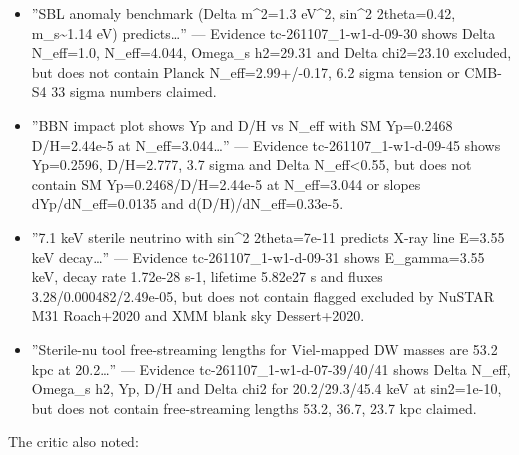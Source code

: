 \documentclass[11pt,a4paper]{article}
\begin{document}
\begin{itemize}
  \item ''SBL anomaly benchmark (Delta m\textasciicircum{}2=1.3 eV\textasciicircum{}2, sin\textasciicircum{}2 2theta=0.42, m\_s\textasciitilde{}1.14 eV) predicts\ldots{}'' --- Evidence tc-261107\_1-w1-d-09-30 shows Delta N\_eff=1.0, N\_eff=4.044, Omega\_s h2=29.31 and Delta chi2=23.10 excluded, but does not contain Planck N\_eff=2.99+/-0.17, 6.2 sigma tension or CMB-S4 33 sigma numbers claimed.
  \item ''BBN impact plot shows Yp and D/H vs N\_eff with SM Yp=0.2468 D/H=2.44e-5 at N\_eff=3.044\ldots{}'' --- Evidence tc-261107\_1-w1-d-09-45 shows Yp=0.2596, D/H=2.777, 3.7 sigma and Delta N\_eff\textless{}0.55, but does not contain SM Yp=0.2468/D/H=2.44e-5 at N\_eff=3.044 or slopes dYp/dN\_eff=0.0135 and d(D/H)/dN\_eff=0.33e-5.
  \item ''7.1 keV sterile neutrino with sin\textasciicircum{}2 2theta=7e-11 predicts X-ray line E=3.55 keV decay\ldots{}'' --- Evidence tc-261107\_1-w1-d-09-31 shows E\_gamma=3.55 keV, decay rate 1.72e-28 s-1, lifetime 5.82e27 s and fluxes 3.28/0.000482/2.49e-05, but does not contain flagged excluded by NuSTAR M31 Roach+2020 and XMM blank sky Dessert+2020.
  \item ''Sterile-nu tool free-streaming lengths for Viel-mapped DW masses are 53.2 kpc at 20.2\ldots{}'' --- Evidence tc-261107\_1-w1-d-07-39/40/41 shows Delta N\_eff, Omega\_s h2, Yp, D/H and Delta chi2 for 20.2/29.3/45.4 keV at sin2=1e-10, but does not contain free-streaming lengths 53.2, 36.7, 23.7 kpc claimed.
\end{itemize}
The critic also noted:
\end{document}
